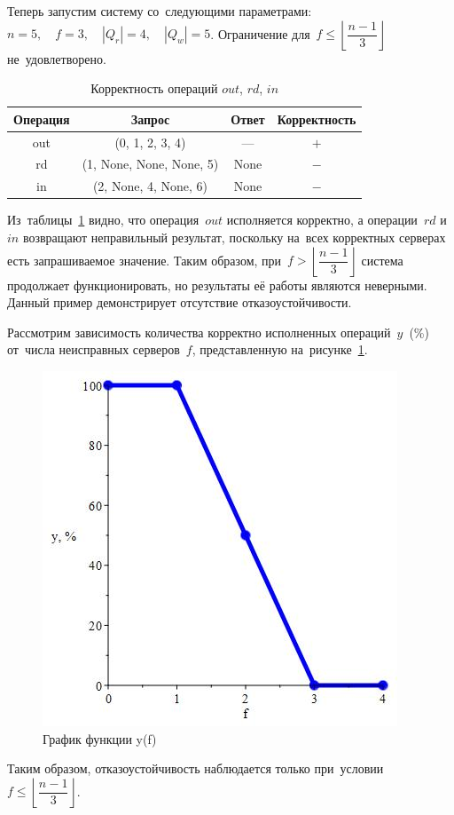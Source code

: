 Теперь запустим систему со~следующими параметрами: $n = 5, \quad f = 3, \quad |Q_r| = 4, \quad |Q_w| = 5$. Ограничение для~$f \leqslant \left\lfloor \dfrac{n-1}{3} \right\rfloor$ не~удовлетворено.
\begin{table}[H]
	\centering
	\caption{Корректность операций $out$, $rd$, $in$}\label{tab:2}
	\begin{tabular}{cccc}
		\toprule
		Операция &     Запрос     & Ответ & Корректность \\
		\midrule
		out      & (0, 1, 2, 3, 4)  &       ---       & $ + $ \\
		rd       & (1, None, None, None, 5)  & None & $ - $ \\
		in       & (2, None, 4, None, 6)  & None & $ - $ \\
		\bottomrule
	\end{tabular}
\end{table}
Из~таблицы~\ref{tab:2} видно, что операция~$out$ исполняется корректно, а операции~$rd$ и~$in$ возвращают неправильный результат, поскольку на~всех корректных серверах есть запрашиваемое значение. Таким образом, при~$f > \left\lfloor \dfrac{n-1}{3} \right\rfloor$ система продолжает функционировать, но результаты её работы являются неверными. Данный пример демонстрирует отсутствие отказоустойчивости.

Рассмотрим зависимость количества корректно исполненных операций~$y$~(\%) от~числа неисправных серверов~$f$, представленную на~рисунке~\ref{plot}.
\begin{figure}[H]
	\centering \includegraphics[scale=0.65]{img/plot}  \caption{График функции y(f)} \label{plot}
\end{figure}
Таким образом, отказоустойчивость наблюдается только при~условии~$f \leqslant \left\lfloor \dfrac{n-1}{3} \right\rfloor$.


